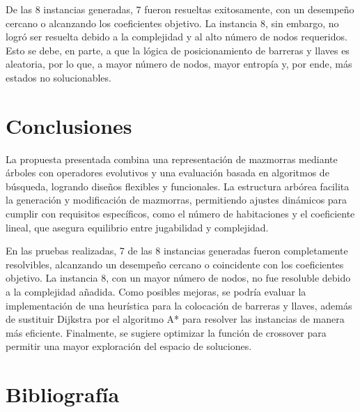 \documentclass[letter, 10pt]{article}
\begin{document}
De las 8 instancias generadas, 7 fueron resueltas exitosamente, con un desempe\~no cercano o alcanzando los coeficientes objetivo. La instancia 8, sin embargo, no logr\'o ser resuelta debido a la complejidad y al alto n\'umero de nodos requeridos. Esto se debe, en parte, a que la l\'ogica de posicionamiento de barreras y llaves es aleatoria, por lo que, a mayor n\'umero de nodos, mayor entrop\'ia y, por ende, m\'as estados no solucionables.


\section{Conclusiones}

La propuesta presentada combina una representaci\'on de mazmorras mediante \'arboles con operadores evolutivos y una evaluaci\'on basada en algoritmos de b\'usqueda, logrando dise\~nos flexibles y funcionales. La estructura arb\'orea facilita la generaci\'on y modificaci\'on de mazmorras, permitiendo ajustes din\'amicos para cumplir con requisitos espec\'ificos, como el n\'umero de habitaciones y el coeficiente lineal, que asegura equilibrio entre jugabilidad y complejidad.

En las pruebas realizadas, 7 de las 8 instancias generadas fueron completamente resolvibles, alcanzando un desempe\~no cercano o coincidente con los coeficientes objetivo. La instancia 8, con un mayor n\'umero de nodos, no fue resoluble debido a la complejidad a\~nadida. Como posibles mejoras, se podr\'ia evaluar la implementaci\'on de una heur\'istica para la colocaci\'on de barreras y llaves, adem\'as de sustituir Dijkstra por el algoritmo A* para resolver las instancias de manera m\'as eficiente. Finalmente, se sugiere optimizar la funci\'on de crossover para permitir una mayor exploraci\'on del espacio de soluciones.

\section{Bibliograf\'ia}


\end{document}
